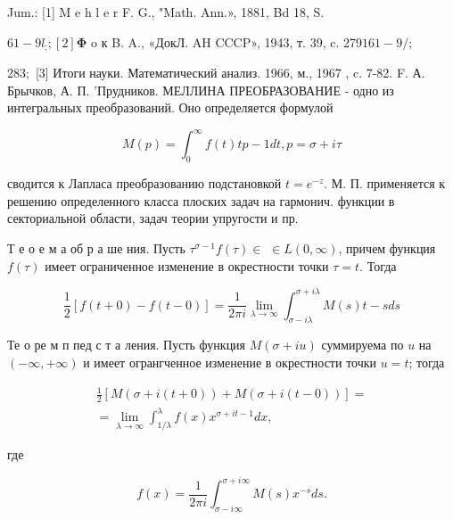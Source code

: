 \documentclass[10pt]{article}
\begin{document}
Jum.: [1] M e h l e r F. G., "Math. Ann.», 1881, Bd 18, S.

$61-9 l_{;} ;[2] \boldsymbol{\Phi}$ o к B. A., «ДокЛ. AH CCCP», 1943, т. 39, c. 279$161-9 / ;$

$283 ;$ [3] Итоги науки. Математический анализ. 1966, м., 1967 , c. 7-82. F. А. Брычков, А. П. 'Прудников. МЕЛЛИНА ПРЕОБРАЗОВАНИЕ - одно из интегральных преобразований. Оно определяется формулой



\[

M(p)=\int_{0}^{\infty} f(t) t p-1 d t, p=\sigma+i \tau

\]



сводится к Лапласа преобразованию подстановкой $t=e^{-z}$. М. П. применяется к решению определенного класса плоских задач на гармонич. функции в секториальной области, задач теории упругости и пр.



Т е о е м а об р а ше ния. Пусть $\tau^{\sigma-1} f(\tau) \in$ $\in L(0, \infty)$, причем функция $f(\tau)$ имеет ограниченное изменение в окрестности точки $\tau=t$. Тогда



\[

\frac{1}{2}[f(t+0)-f(t-0)]=\frac{1}{2 \pi i} \lim _{\lambda \rightarrow \infty} \int_{\sigma-i \lambda}^{\sigma+i \lambda} M(s) t-s d s

\]



Те о ре м п пед с т а ления. Пусть функция $M(\sigma+i u)$ суммируема по $u$ на $(-\infty,+\infty)$ и имеет огрангченное изменение в окрестности точки $u=t$; тогда



\[

\begin{gathered}

\frac{1}{2}[M(\sigma+i(t+0))+M(\sigma+i(t-0))]= \\

=\lim _{\lambda \rightarrow \infty} \int_{1 / \lambda}^{\lambda} f(x) x^{\sigma+i t-1} d x,

\end{gathered}

\]



где



\[

f(x)=\frac{1}{2 \pi i} \int_{\sigma-i \infty}^{\sigma+i \infty} M(s) x^{-s} d s .

\]
\end{document}
